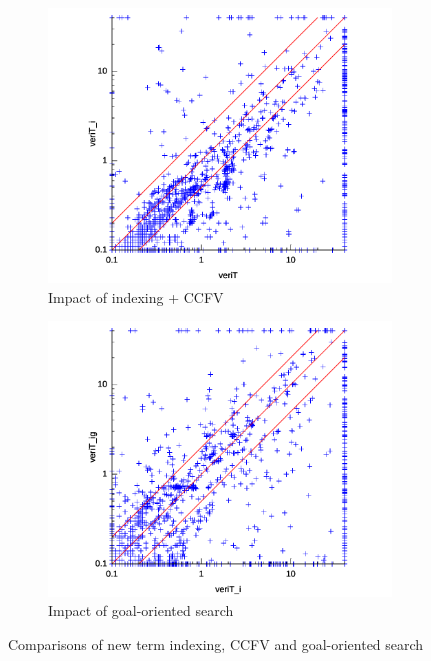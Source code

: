 \message{ !name(main.tex)}\documentclass{easychair}
\begin{document}
\begin{figure}[htbp]
\begin{subfigure}{.49\textwidth}
  \centering
  \includegraphics[scale=.42]{i_devel.pdf}
  \caption{Impact of indexing + CCFV}
  \label{fig:sfig1}
\end{subfigure}%
\hfill
\begin{subfigure}{.49\textwidth}
  \centering
  \includegraphics[scale=.42]{SIG_i.pdf}
  \caption{Impact of goal-oriented search}
  \label{fig:sfig2}
\end{subfigure}
\caption{Comparisons of new term indexing, CCFV and goal-oriented search}
\label{fig:fig1}
\end{figure}
\end{document}
